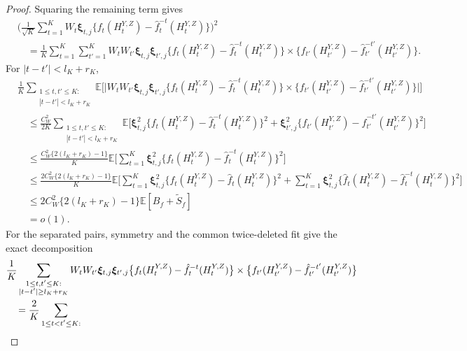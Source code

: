 \documentclass[10pt,a4paper]{amsart}
\def\E{\mathbb{E}}
\begin{document}
\begin{proof}
Squaring the remaining term gives
\begin{equation}
\label{eq:outcome-square-expansion}
\begin{aligned}
&\Big(\frac1{\sqrt K}\sum_{t=1}^K W_t\boldsymbol\xi_{t,j}
\big\{f_t(H_t^{Y,Z})-\hat f_t^{-t}(H_t^{Y,Z})\big\}\Big)^2\\
&\quad=\frac1K\sum_{t=1}^K\sum_{t'=1}^K
W_tW_{t'}\boldsymbol\xi_{t,j}\boldsymbol\xi_{t',j}
\big\{f_t(H_t^{Y,Z})-\hat f_t^{-t}(H_t^{Y,Z})\big\}\times
\big\{f_{t'}(H_{t'}^{Y,Z})
-\hat f_{t'}^{-t'}(H_{t'}^{Y,Z})\big\}.
\end{aligned}
\end{equation}
For \(|t-t'|<l_K+r_K\),
\begin{align*}
&\frac1K\sum_{\substack{1\leq t,t'\leq K:\\
|t-t'|<l_K+r_K}}
\E\Big[
\Big|W_tW_{t'}\boldsymbol\xi_{t,j}\boldsymbol\xi_{t',j}
\big\{f_t(H_t^{Y,Z})-\hat f_t^{-t}(H_t^{Y,Z})\big\}\times
\big\{f_{t'}(H_{t'}^{Y,Z})
-\hat f_{t'}^{-t'}(H_{t'}^{Y,Z})\big\}\Big|
\Big]\\
&\quad\leq\frac{C_W^2}{2K}
\sum_{\substack{1\leq t,t'\leq K:\\
|t-t'|<l_K+r_K}}
\E\Big[
\boldsymbol\xi_{t,j}^2
\big\{f_t(H_t^{Y,Z})-\hat f_t^{-t}(H_t^{Y,Z})\big\}^2+
\boldsymbol\xi_{t',j}^2
\big\{f_{t'}(H_{t'}^{Y,Z})
-\hat f_{t'}^{-t'}(H_{t'}^{Y,Z})\big\}^2
\Big]\\
&\quad\leq\frac{C_W^2\{2(l_K+r_K)-1\}}K
\E\Big[
\sum_{t=1}^K\boldsymbol\xi_{t,j}^2
\big\{f_t(H_t^{Y,Z})-\hat f_t^{-t}(H_t^{Y,Z})\big\}^2
\Big]\\
&\quad\leq\frac{2C_W^2\{2(l_K+r_K)-1\}}K
\E\Big[
\sum_{t=1}^K\boldsymbol\xi_{t,j}^2
\big\{f_t(H_t^{Y,Z})-\hat f_t(H_t^{Y,Z})\big\}^2+
\sum_{t=1}^K\boldsymbol\xi_{t,j}^2
\big\{\hat f_t(H_t^{Y,Z})-\hat f_t^{-t}(H_t^{Y,Z})\big\}^2
\Big]\\
&\quad\leq
2C_W^2\{2(l_K+r_K)-1\}\E[B_f+\tilde S_f]\\
&\quad=o(1).
\end{align*}
For the separated pairs, symmetry and the common twice-deleted fit
give the exact decomposition
\begin{align}
&\frac1K\sum_{\substack{1\leq t,t'\leq K:\\
|t-t'|\geq l_K+r_K}}
W_tW_{t'}\boldsymbol\xi_{t,j}\boldsymbol\xi_{t',j}
\big\{f_t(H_t^{Y,Z})-\hat f_t^{-t}(H_t^{Y,Z})\big\}
\times
\big\{f_{t'}(H_{t'}^{Y,Z})
-\hat f_{t'}^{-t'}(H_{t'}^{Y,Z})\big\}
\notag\\
&\quad=\frac2K\sum_{\substack{1\leq t<t'\leq K:\\
}}
\end{align}
\end{proof}
\end{document}
